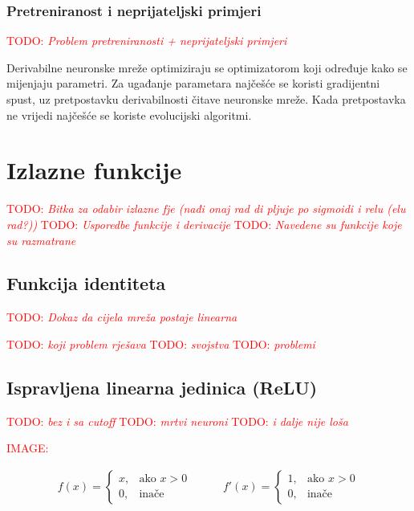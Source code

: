 \documentclass[times, utf8, diplomski]{fer}
\def\TODO#1{\noindent\textcolor{red}{TODO: \textit{#1}}\newline}
\def\todo#1{\TODO{#1}}
\def\todoimg#1{\begin{center} \textcolor{red}{IMAGE: \textit{#1}} \end{center}}
\begin{document}
\subsubsection{Pretreniranost i neprijateljski primjeri}
\todo{Problem pretreniranosti + neprijateljski primjeri}

Derivabilne neuronske mreže optimiziraju se optimizatorom koji određuje kako se mijenjaju parametri. Za ugađanje parametara najčešće se koristi gradijentni spust, uz pretpostavku derivabilnosti čitave neuronske mreže. Kada pretpostavka ne vrijedi najčešće se koriste evolucijski algoritmi.

\section{Izlazne funkcije}
\label{sec:izlazne_fje}
\todo{Bitka za odabir izlazne fje (nađi onaj rad di pljuje po sigmoidi i relu (elu rad?))}
\todo{Usporedbe funkcije i derivacije}
\todo{Navedene su funkcije koje su razmatrane}

\subsection{Funkcija identiteta}

\todo{Dokaz da cijela mreža postaje linearna}

\todo{koji problem rješava}
\todo{svojstva}
\todo{problemi}

\subsection*{Ispravljena linearna jedinica (ReLU)}

\todo{bez i sa cutoff}
\todo{mrtvi neuroni}
\todo{i dalje nije loša}

\todoimg{}

\begin{equation}
\begin{split}
f(x) = 
\begin{cases}
x,		& \text{ako } x > 0 \\
0,		& \text{inače}
\end{cases}
\end{split}
\qquad
\begin{split}
f'(x) = 
\begin{cases}
1,		& \text{ako } x > 0 \\
0,		& \text{inače}
\end{cases}
\end{split}
\end{equation}
\end{document}
